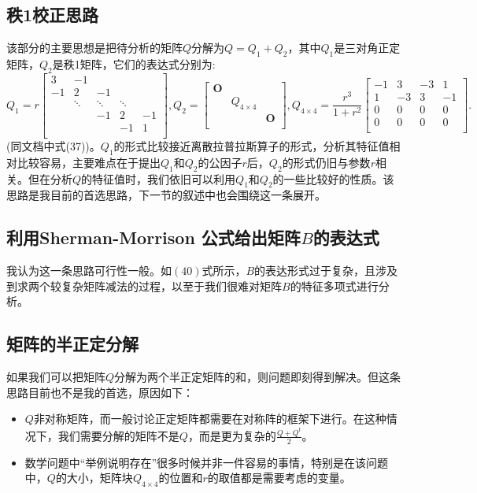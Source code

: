 \documentclass[UTF8]{ctexart}
\theoremstyle{plain}
\theoremstyle{definition}
\theoremstyle{remark}
\begin{document}
\subsection{秩1校正思路}
该部分的主要思想是把待分析的矩阵$Q$分解为$Q=Q_{1}+Q_{2}$，其中$Q_1$是三对角正定矩阵，$Q_2$是秩1矩阵，它们的表达式分别为:
\begin{equation}
    \label{eq:rank1repair}
    Q_{1}=r\begin{bmatrix}
        3&-1& & &\\
        -1&2&-1& & \\
         &\ddots&\ddots&\ddots& \\
         & &-1&2&-1\\
         & & &-1&1\\
    \end{bmatrix}
    ,Q_{2}=\begin{bmatrix}
        \mathbf{O}& & \\
        & Q_{4\times 4}& \\
        & & \mathbf{O}\\
    \end{bmatrix}
    ,Q_{4\times 4}=\frac{r^3}{1+r^2}\begin{bmatrix}
        -1&3&-3&1\\
        1&-3&3&-1\\
        0&0&0&0\\
        0&0&0&0\\
    \end{bmatrix}.
\end{equation}
(同文档中式(37))。$Q_{1}$的形式比较接近离散拉普拉斯算子的形式，分析其特征值相对比较容易，主要难点在于提出$Q_{1}$和$Q_{2}$的公因子$r$后，$Q_{2}$的形式仍旧与参数$r$相关。但在分析$Q$的特征值时，我们依旧可以利用$Q_{1}$和$Q_{2}$的一些比较好的性质。该思路是我目前的首选思路，下一节的叙述中也会围绕这一条展开。
\subsection{利用Sherman-Morrison 公式给出矩阵$B$的表达式}
我认为这一条思路可行性一般。如$(40)$式所示，$B$的表达形式过于复杂，且涉及到求两个较复杂矩阵减法的过程，以至于我们很难对矩阵$B$的特征多项式进行分析。
\subsection{矩阵的半正定分解}
如果我们可以把矩阵$Q$分解为两个半正定矩阵的和，则问题即刻得到解决。但这条思路目前也不是我的首选，原因如下：
\begin{itemize}
    \item $Q$非对称矩阵，而一般讨论正定矩阵都需要在对称阵的框架下进行。在这种情况下，我们需要分解的矩阵不是$Q$，而是更为复杂的$\frac{Q+Q^{t}}{2}$。
    \item 数学问题中“举例说明存在”很多时候并非一件容易的事情，特别是在该问题中，$Q$的大小，矩阵块$Q_{4\times 4}$的位置和$r$的取值都是需要考虑的变量。
\end{itemize}
\end{document}
